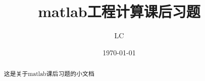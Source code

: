 \documentclass[UTF8]{ctexart}
\begin{document}

\renewcommand{\headrulewidth}{0.7pt} %

\renewcommand{\footrulewidth}{0pt}

\pagestyle{fancy} %
\title{matlab工程计算课后习题}
\author{LC}
\date{\today}
\maketitle

\begin{abstract}
\centering 这是关于matlab课后习题的小文档 
\end{abstract}
\tableofcontents
\end{document}
